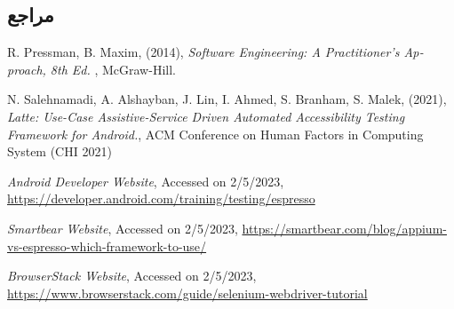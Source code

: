 { 

\subsection*{مراجع}

\begin{latin}
	\begingroup
	\renewcommand{\section}[2]{}%
	
\begin{thebibliography}{9}

	
	



	R. Pressman,   B. Maxim, (2014),
	\textit{Software Engineering: A Practitioner’s Approach, 8th Ed. },
	McGraw-Hill.

	
	N. Salehnamadi, A. Alshayban, J. Lin, I. Ahmed, S. Branham, S. Malek, (2021),
	\textit{Latte: Use-Case Assistive-Service Driven Automated Accessibility Testing Framework for Android.},
	ACM Conference on Human Factors in Computing System (CHI 2021)
	
	
	\textit{Android Developer Website},
	Accessed on 2/5/2023,
	\url{https://developer.android.com/training/testing/espresso}
	
	\textit{Smartbear Website},
	Accessed on 2/5/2023,
	\url{https://smartbear.com/blog/appium-vs-espresso-which-framework-to-use/}
	
	\textit{BrowserStack Website},
	Accessed on 2/5/2023,
	\url{https://www.browserstack.com/guide/selenium-webdriver-tutorial}

\end{thebibliography}
\endgroup
\end{latin}

}
